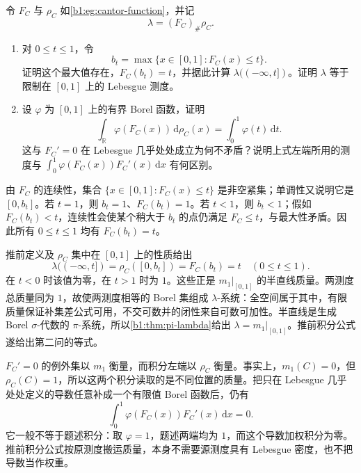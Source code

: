 \begin{exercise}\label{b1:ex:14-cantor-function}
令 \(F_C\) 与 \(\rho_C\) 如\cref{b1:eg:cantor-function}，并记
\[
 \lambda=(F_C)_\#\rho_C.
\]
\begin{enumerate}
\item\label{b1:item:14-cantor-continuity}
对 \(0\leq t\leq1\)，令
\[
 b_t=\max\{x\in[0,1]:F_C(x)\leq t\}.
\]
证明这个最大值存在，\(F_C(b_t)=t\)，并据此计算 \(\lambda(( -\infty,t])\)。证明 \(\lambda\) 等于限制在 \([0,1]\) 上的 Lebesgue 测度。
\item\label{b1:item:14-cantor-derivative}
设 \(\varphi\) 为 \([0,1]\) 上的有界 Borel 函数，证明
\[
 \int_{\mathbb R}\varphi(F_C(x))\,\mathrm d\rho_C(x)
 =\int_0^1\varphi(t)\,\mathrm dt.
\]
这与 \(F_C'=0\) 在 Lebesgue 几乎处处成立为何不矛盾？说明上式左端所用的测度与 \(\int_0^1\varphi(F_C(x))F_C'(x)\,\mathrm dx\) 有何区别。
\end{enumerate}
\end{exercise}
\begin{solution}
由 \(F_C\) 的连续性，集合 \(\{x\in[0,1]:F_C(x)\leq t\}\) 是非空紧集；单调性又说明它是 \([0,b_t]\)。若 \(t=1\)，则 \(b_t=1\)、\(F_C(b_t)=1\)。若 \(t<1\)，则 \(b_t<1\)；假如 \(F_C(b_t)<t\)，连续性会使某个稍大于 \(b_t\) 的点仍满足 \(F_C\leq t\)，与最大性矛盾。因此所有 \(0\leq t\leq1\) 均有 \(F_C(b_t)=t\)。

推前定义及 \(\rho_C\) 集中在 \([0,1]\) 上的性质给出
\[
 \lambda(( -\infty,t])
 =\rho_C([0,b_t])
 =F_C(b_t)=t\quad(0\leq t\leq1).
\]
在 \(t<0\) 时该值为零，在 \(t>1\) 时为 \(1\)。这些正是 \(m_1|_{[0,1]}\) 的半直线质量。两测度总质量同为 \(1\)，故使两测度相等的 Borel 集组成 \(\lambda\)-系统：全空间属于其中，有限质量保证补集差公式可用，不交可数并的闭性来自可数可加性。半直线是生成 Borel \(\sigma\)-代数的 \(\pi\)-系统，所以\cref{b1:thm:pi-lambda}给出 \(\lambda=m_1|_{[0,1]}\)。推前积分公式遂给出第二问的等式。

\(F_C'=0\) 的例外集以 \(m_1\) 衡量，而积分左端以 \(\rho_C\) 衡量。事实上，\(m_1(C)=0\)，但 \(\rho_C(C)=1\)，所以这两个积分读取的是不同位置的质量。把只在 Lebesgue 几乎处处定义的导数任意补成一个有限值 Borel 函数后，仍有
\[
 \int_0^1\varphi(F_C(x))F_C'(x)\,\mathrm dx=0.
\]
它一般不等于题述积分：取 \(\varphi=1\)，题述两端均为 \(1\)，而这个导数加权积分为零。推前积分公式按原测度搬运质量，本身不需要源测度具有 Lebesgue 密度，也不把导数当作权重。
\end{solution}


